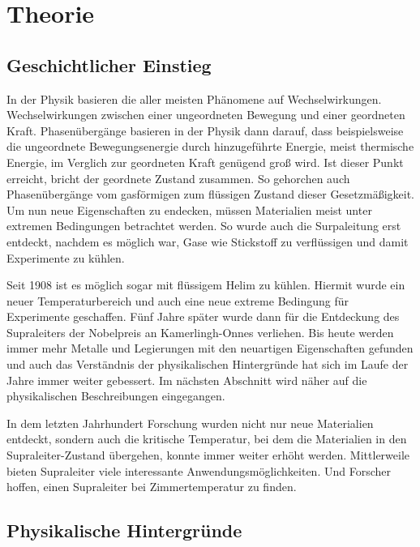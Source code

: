 \section{Theorie}
\label{sec:Theorie}
\subsection{Geschichtlicher Einstieg}
In der Physik basieren die aller meisten Ph\"anomene auf Wechselwir{\-}kun{\-}gen.
Wechselwir{\-}kun{\-}gen zwischen einer ungeordneten Bewegung und einer geordneten Kraft.
Phasen\"uberg\"ange basieren in der Physik dann darauf, dass beispielsweise die ungeordnete Bewegungsenergie durch hinzugef\"uhrte Energie, meist thermische Energie, im Verglich zur geordneten Kraft gen\"ugend gro{\ss} wird.
Ist dieser Punkt erreicht, bricht der geordnete Zustand zusammen.
So gehorchen auch Phasen\"uberg\"ange vom gasf\"ormigen zum fl\"ussigen Zustand dieser Gesetzm\"a{\ss}igkeit.
Um nun neue Eigenschaften zu endecken, m\"ussen Materialien meist unter extremen Bedingungen betrachtet werden.
So wurde auch die Surpaleitung erst entdeckt, nachdem es m\"oglich war, Gase wie Stickstoff zu verfl\"ussigen und damit Experimente zu k\"uhlen.

Seit 1908 ist es m\"oglich sogar mit fl\"ussigem Helim zu k\"uhlen.
Hiermit wurde ein neuer Temperaturbereich und auch eine neue extreme Bedingung f\"ur Experimente geschaffen.
F\"unf Jahre sp\"ater wurde dann f\"ur die Entdeckung des Supraleiters der Nobelpreis an Kamerlingh-Onnes verliehen.
Bis heute werden immer mehr Metalle und Legierungen mit den neuartigen Eigenschaften gefunden und auch das Verst\"andnis der physikalischen Hintergr\"unde hat sich im Laufe der Jahre immer weiter gebessert.
Im n\"achsten Abschnitt wird n\"aher auf die physikalischen Beschreibungen eingegangen.

In dem letzten Jahrhundert Forschung wurden nicht nur neue Materialien entdeckt, sondern auch die kritische Temperatur, bei dem die Materialien in den Supraleiter-Zustand \"ubergehen, konnte immer weiter erh\"oht werden.
Mittlerweile bieten Supraleiter viele interessante Anwendungsmöglichkeiten.
Und Forscher hoffen, einen Supraleiter bei Zimmertemperatur zu finden.

\subsection{Physikalische Hintergr\"unde}
\label{sec:phyHintergrunde}
